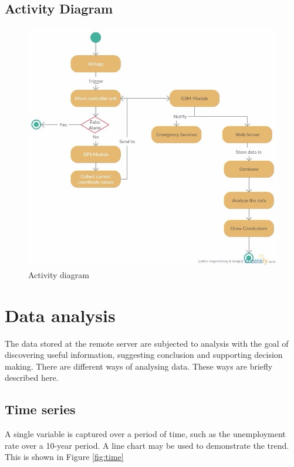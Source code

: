 \documentclass{llncs}
\begin{document}
\subsection{Activity Diagram}
\begin{figure}[h!]
\centering
\includegraphics[scale=0.5]{acti}
\caption{Activity diagram}
\label{fig:acti}
\end{figure}

\newpage

\section{Data analysis}
The data stored at the remote server are subjected to analysis with the goal of discovering useful information, suggesting conclusion and supporting decision making. There are different ways of analysing data. These ways are briefly described here.

\subsection{Time series}
A single variable is captured over a period of time, such as the unemployment rate over a 10-year period. A line chart may be used to demonstrate the trend. This is shown in Figure \ref{fig:time}
\end{document}

